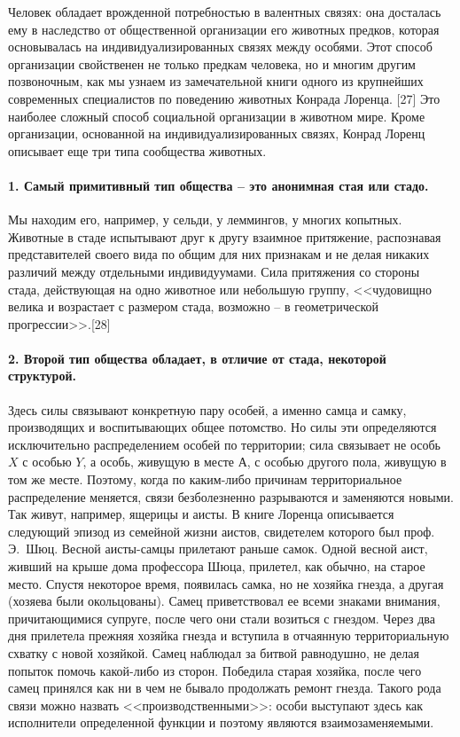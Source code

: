 \documentclass{book}
\begin{document}
Человек обладает врожденной потребностью в валентных связях: она досталась ему в наследство от общественной ор­ганизации его животных предков, которая основывалась на индивидуализированных связях между особями. Этот способ организации свойственен не только предкам человека, но и мно­гим другим позвоночным, как мы узнаем из замечательной книги одного из крупнейших современных специалистов по по­ведению животных Конрада Лоренца. [27] Это наиболее сложный способ социальной организации в животном мире. Кроме организации, основанной на индивидуализированных связях, Конрад Лоренц описывает еще три типа сообщества животных.

\paragraph{1. Самый примитивный тип общества -- это анонимная стая или стадо.}  Мы находим его, например, у сельди, у леммингов, у многих копытных. Животные в стаде испытывают друг к другу взаимное притяжение, распознавая представителей своего вида по общим для них признакам и не делая никаких разли­чий между отдельными индивидуумами. Сила притяжения со стороны стада, действующая на одно животное или неболь­шую группу, <<чудовищно велика и возрастает с размером стада, возможно -- в геометрической прогрессии>>.[28]

\paragraph{2. Второй тип общества обладает, в отличие от стада, неко­торой структурой.} Здесь силы связывают конкретную пару особей, а именно самца и самку, производящих и воспитываю­щих общее потомство. Но силы эти определяются исключитель­но распределением особей по территории; сила связывает не особь $X$  с особью $Y$, а особь, живущую в месте $А$, с особью другого пола, живущую в том же месте. Поэтому, когда по каким-либо причинам территориальное распределение меняет­ся, связи безболезненно разрываются и заменяются новыми. Так живут, например, ящерицы и аисты. В книге Лоренца описы­вается следующий эпизод из семейной жизни аистов, свидете­лем которого был проф. Э.~Шюц. Весной аисты-самцы прилетают раньше самок. Одной весной аист, живший на крыше дома профессора Шюца, прилетел, как обычно, на старое место. Спустя некоторое время, появилась самка, но не хозяйка гнезда, а другая (хозяева были окольцованы). Самец приветствовал ее всеми знаками внимания, причитающимися супруге, после чего они стали возиться с 
гнездом. Через два дня прилетела прежняя хозяйка гнезда и вступила в отчаянную территориальную схватку с новой хозяйкой. Самец наблюдал за битвой равнодушно, не делая попыток помочь какой-либо из сторон. Победила старая хозяйка, после чего самец принялся как ни в чем не бывало продолжать ремонт гнезда. Такого рода связи можно назвать <<производственными>>: особи выступают здесь как исполнители определенной функции и поэтому являются взаимозаменяемыми.
\end{document}
